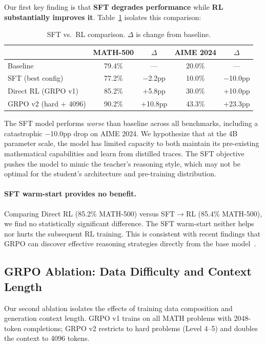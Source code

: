 \documentclass[11pt,a4paper]{article}
\begin{document}
Our first key finding is that \textbf{SFT degrades performance} while \textbf{RL substantially improves it}. Table~\ref{tab:sft-vs-rl} isolates this comparison:

\begin{table}[H]
\centering
\caption{SFT vs.\ RL comparison. $\Delta$ is change from baseline.}
\label{tab:sft-vs-rl}
\begin{tabular}{lcccc}
\toprule
& \textbf{MATH-500} & $\Delta$ & \textbf{AIME 2024} & $\Delta$ \\
\midrule
Baseline & 79.4\% & --- & 20.0\% & --- \\
SFT (best config) & 77.2\% & $-$2.2pp & 10.0\% & $-$10.0pp \\
Direct RL (GRPO v1) & 85.2\% & +5.8pp & 30.0\% & +10.0pp \\
GRPO v2 (hard + 4096) & 90.2\% & +10.8pp & 43.3\% & +23.3pp \\
\bottomrule
\end{tabular}
\end{table}

The SFT model performs \emph{worse} than baseline across all benchmarks, including a catastrophic $-$10.0pp drop on AIME 2024. We hypothesize that at the 4B parameter scale, the model has limited capacity to both maintain its pre-existing mathematical capabilities and learn from distilled traces. The SFT objective pushes the model to mimic the teacher's reasoning style, which may not be optimal for the student's architecture and pre-training distribution.

\paragraph{SFT warm-start provides no benefit.} Comparing Direct RL (85.2\% MATH-500) versus SFT$\rightarrow$RL (85.4\% MATH-500), we find no statistically significant difference. The SFT warm-start neither helps nor hurts the subsequent RL training. This is consistent with recent findings that GRPO can discover effective reasoning strategies directly from the base model~\citep{deepseek2025r1}.

\subsection{GRPO Ablation: Data Difficulty and Context Length}
\label{sec:grpo-ablation}

Our second ablation isolates the effects of training data composition and generation context length. GRPO v1 trains on all MATH problems with 2048-token completions; GRPO v2 restricts to hard problems (Level 4--5) and doubles the context to 4096 tokens.
\end{document}
